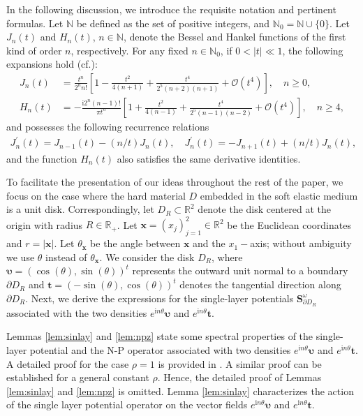 \documentclass[11pt,reqno,twoside]{amsart}
\theoremstyle{definition}
\theoremstyle{remark}
\numberwithin{equation}{section}
\newcommand{\bx}{\mathbf{x}}
\begin{document}
In the following discussion, we introduce the requisite notation and pertinent formulas. Let $\mathbb{N}$ be defined as the set of positive integers, and $\mathbb{N}_{0}=\mathbb{N}\cup\{0\}$. Let $J_{n}(t)$ and $H_n(t)$, $n\in\mathbb{N}$, denote the Bessel and Hankel functions of the first kind of order $n$, respectively. For any fixed $n\in\mathbb{N}_{0}$, if $0<|t|\ll1$, the following expansions hold (cf.\cite{CK}):
\begin{align}
	J_{n}(t) &=\frac{t^{n} }{2^{n}n! } \left [ 1-\frac{t^{2} }{4(n+1)}  +\frac{t^{4} }{2^{5}(n+2)(n+1) } + \mathcal{O}(t^4)\right ], \quad n\ge 0,\label{eq:jn}\\
	H_{n}(t)&=-\frac{\mathrm{i}2^{n} (n-1)!}{\pi t^{n} } \left [ 1+\frac{t^{2} }{4(n-1)} +\frac{t^{4} }{2^{5}(n-1)(n-2)}+\mathcal{O}(t^4)  \right ], \quad n\ge 4,\label{eq:hn}
\end{align}
and possesses the following recurrence relations 
\begin{align}
	J_{n}^{\prime}(t)=J_{n-1}(t)-(n/t)J_{n}(t),\quad
	J_{n}^{\prime}(t)=-J_{n+1}(t)+(n/t)J_{n}(t),\label{eq:dtgx}
\end{align}
and the function $H_n(t) $ also satisfies the same derivative identities.

To facilitate the presentation of our ideas throughout the rest of the paper, we focus on the case where the hard material \(D\) embedded in the soft elastic medium is a unit disk.  Correspondingly, let $D_R \subset \mathbb{R}^2$ denote the disk centered at the origin with radius $R \in \mathbb{R}_+$.  Let $\bx=\left(x_{j}\right)_{j=1}^{2} \in \mathbb{R}^{2}$  be the Euclidean coordinates and $r=|\bx|$. Let $\theta_{\bx}$ be the angle between $\bx$ and the $x_{1}-$axis; without ambiguity we use $\theta$ instead of $\theta_{\bx}$. We consider the disk $D_{R}$, where $\bm{\upsilon}=(\cos(\theta),\sin(\theta))^t$ represents the  outward unit normal to a boundary $\partial D_{R}$ and $\bm{t}=(-\sin(\theta),\cos(\theta))^{t}$ denotes the tangential direction along $\partial D_{R}$. Next, we derive the expressions for the single-layer potentials $\mathbf{S}_{\partial D_R}^\omega $ associated with the two densities $e^{\mathrm{i}n\theta}\bm{\upsilon}$ and $e^{\mathrm{i}n\theta}\bm{t}$.

Lemmas \ref{lem:sinlay} and \ref{lem:npz} state some spectral properties of the single-layer potential and the N-P operator associated with two densities \(e^{\mathrm{i}n\theta}\bm{\upsilon}\) and \(e^{\mathrm{i}n\theta}\bm{t}\).
A detailed proof for the case \(\rho = 1\) is provided in \cite[Theorem 1, Proposition 1, Lemma 8-10]{HHZJ}. A similar proof can be established for a general constant \(\rho\). Hence, the detailed proof of Lemmas \ref{lem:sinlay} and \ref{lem:npz} is omitted. Lemma \ref{lem:sinlay} characterizes the action of the single layer potential operator on the vector fields $e^{\mathrm{i}n\theta}\bm{\upsilon}$ and $e^{\mathrm{i}n\theta}\bm{t} $.
\end{document}
